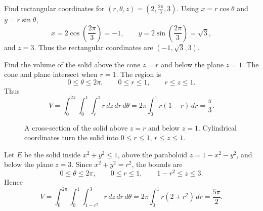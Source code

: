 \documentclass[11pt,oneside]{book}
\begin{document}
\begin{examplebox}
Find rectangular coordinates for $(r,\theta,z)=\left(2,\frac{2\pi}{3},3\right)$. Using $x=r\cos\theta$ and $y=r\sin\theta$,
\[
x=2\cos\left(\frac{2\pi}{3}\right)=-1,
\qquad
y=2\sin\left(\frac{2\pi}{3}\right)=\sqrt3,
\]
and $z=3$. Thus the rectangular coordinates are $(-1,\sqrt3,3)$.
\end{examplebox}

\begin{examplebox}
Find the volume of the solid above the cone $z=r$ and below the plane $z=1$.
The cone and plane intersect when $r=1$. The region is
\[
0\le \theta\le 2\pi,\qquad 0\le r\le 1,\qquad r\le z\le 1.
\]
Thus
\[
V=\int_0^{2\pi}\int_0^1\int_r^1 r\,dz\,dr\,d\theta
=2\pi\int_0^1 r(1-r)\,dr=\frac{\pi}{3}.
\]
\end{examplebox}

\begin{figure}[H]
\centering
{}
\caption{A cross-section of the solid above $z=r$ and below $z=1$. Cylindrical coordinates turn the solid into $0\le r\le 1$, $r\le z\le 1$.}
\end{figure}

\begin{examplebox}
Let $E$ be the solid inside $x^2+y^2\le 1$, above the paraboloid $z=1-x^2-y^2$, and below the plane $z=3$. Since $x^2+y^2=r^2$, the bounds are
\[
0\le \theta\le 2\pi,\qquad 0\le r\le 1,\qquad 1-r^2\le z\le 3.
\]
Hence
\[
V=\int_0^{2\pi}\int_0^1\int_{1-r^2}^{3} r\,dz\,dr\,d\theta
=2\pi\int_0^1 r(2+r^2)\,dr=\frac{5\pi}{2}.
\]
\end{examplebox}
\end{document}

